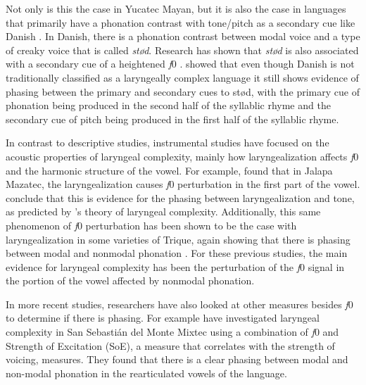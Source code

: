 Not only is this the case in Yucatec Mayan, but it is also the case in languages that primarily have a phonation contrast with tone/pitch as a secondary cue like Danish \citep{fischer-jorgensenPhoneticAnalysisStod1989,gronnumDanishStodLaryngealization2013,penaStodTimingDomain2022,penaProductionPerceptionStod2024}. In Danish, there is a phonation contrast between modal voice and a type of creaky voice that is called \textit{stød}. Research has shown that \textit{stød} is also associated with a secondary cue of a heightened \textit{f}0 \citep{fischer-jorgensenPhoneticAnalysisStod1989,gronnumDanishStodLaryngealization2013}. \citet{penaStodTimingDomain2022,penaProductionPerceptionStod2024} showed that even though Danish is not traditionally classified as a laryngeally complex language it still shows evidence of phasing between the primary and secondary cues to stød, with the primary cue of phonation being produced in the second half of the syllablic rhyme and the secondary cue of pitch being produced in the first half of the syllablic rhyme.

In contrast to descriptive studies, instrumental studies have focused on the acoustic properties of laryngeal complexity, mainly how laryngealization affects \textit{f}0 and the harmonic structure of the vowel. For example, \citet{garellekAcousticConsequencesPhonation2011} found that in Jalapa Mazatec, the laryngealization causes \textit{f}0 perturbation in the first part of the vowel. \citeauthor{garellekAcousticConsequencesPhonation2011} conclude that this is evidence for the phasing between laryngealization and tone, as predicted by \citeauthor{silvermanLaryngealComplexityOtomanguean1997}'s \citeyear{silvermanLaryngealComplexityOtomanguean1997} theory of laryngeal complexity. Additionally, this same phenomenon of \textit{f}0 perturbation has been shown to be the case with laryngealization in some varieties of Trique, again showing that there is phasing between modal and nonmodal phonation \citep{dicanioCoarticulationToneGlottal2012}. For these previous studies, the main evidence for laryngeal complexity has been the perturbation of the \textit{f}0 signal in the portion of the vowel affected by nonmodal phonation.

In more recent studies, researchers have also looked at other measures besides \textit{f}0 to determine if there is phasing. For example \citet{wellerInteractionsToneGlottalization2023,wellerLexicalToneVowel2023,wellerVoiceQualityTone2024} have investigated laryngeal complexity in San Sebastián del Monte Mixtec using a combination of \textit{f}0 and Strength of Excitation (SoE), a measure that correlates with the strength of voicing, measures. They found that there is a clear phasing between modal and non-modal phonation in the rearticulated vowels of the language. 

